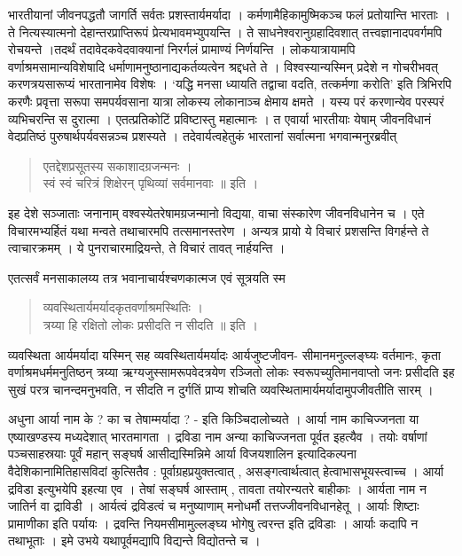 भारतीयानां जीवनपद्धतौ जागर्ति सर्वतः प्रशस्तार्यमर्यादा । कर्मणामैहिकामुष्मिकञ्च फलं प्रतोयान्ति भारताः । ते नित्यस्यात्मनो देहान्तरप्राप्तिरूपं प्रेत्यभावमभ्युपयन्ति । ते साधनेश्वरानुग्रहादिवशात् तत्त्वज्ञानादपवर्गमपि रोचयन्ते ।तदर्थं तदावेदकवेदवाक्यानां निरर्गलं प्रामाण्यं निर्णयन्ति । लोकयात्रायामपि वर्णाश्रमसामान्यविशेषादि धर्माणामनुष्ठानाद्यकर्तव्यत्वेन श्रद्दधते ते । विश्वस्यान्यस्मिन् प्रदेशे न गोचरीभवत् करणत्रयसारूप्यं भारतानामेव विशेषः  । ‘यद्धि मनसा ध्यायति  तद्वाचा वदति, तत्कर्मणा करोति’ इति त्रिभिरपि करणैः प्रवृत्ता सरूपा समपर्यवसाना यात्रा लोकस्य लोकानाञ्च क्षेमाय क्षमते । यस्य परं करणान्येव परस्परं व्यभिचरन्ति स दुरात्मा । एतत्प्रतिकोटिं प्रविष्टास्तु महात्मानः । त एवार्या भारतीयाः येषाम् जीवनविधानं वेदप्रतिष्ठं पुरुषार्थपर्यवसन्नञ्च प्रशस्यते । तदेवार्यत्वहेतुकं भारतानां सर्वात्मना भगवान्मनुरब्रवीत्  
\begin{verse}
एतद्देशप्रसूतस्य सकाशादग्रजन्मनः ।\\
स्वं स्वं चरित्रं शिक्षेरन् पृथिव्यां सर्वमानवाः ॥ इति ।
\end{verse}
इह देशे सञ्जाताः जनानाम् वश्वस्येतरेषामग्रजन्मानो विद्यया, वाचा संस्कारेण जीवनविधानेन च । एते विचारमभ्यर्हितं यथा मन्वते तथाचारमपि तत्समानस्तरेण । अन्यत्र प्रायो ये विचारं प्रशसन्ति विगर्हन्ते ते त्वाचारक्रमम् । ये पुनराचारमाद्रियन्ते, ते विचारं तावत् नार्हयन्ति ।

एतत्सर्वं मनसाकालय्य तत्र भवानाचार्यश्चणकात्मज एवं सूत्रयति स्म 
\begin{verse}
व्यवस्थितार्यमर्यादकृतवर्णाश्रमस्थितिः । \\
त्रय्या हि रक्षितो लोकः प्रसीदति न सीदति ॥ इति ।
\end{verse}
व्यवस्थिता आर्यमर्यादा यस्मिन् सह व्यवस्थितार्यमर्यादः आर्यजुष्टजीवन- सीमानमनुल्लङ्घ्यः वर्तमानः, कृता वर्णाश्रमधर्ममनुतिष्ठन् त्रय्या ऋग्यजुस्सामरूपवेदत्रयेण रञ्जितो लोकः स्वरूपच्युतिमानवाप्तो जनः प्रसीदति इह सुखं परत्र चानन्दमनुभवति, न सीदति न दुर्गतिं प्राप्य शोचति व्यवस्थितामार्यमर्यादामुपजीवतीति सारम् ।

अधुना आर्या नाम के ? का च तेषाम्मर्यादा ? - इति किञ्चिदालोच्यते । आर्या नाम काचिज्जनता या एष्याखण्डस्य मध्यदेशात् भारतमागता । द्रविडा नाम अन्या काचिज्जनता पूर्वत इहत्यैव । तयोः वर्षाणां पञ्चसाहस्रयाः पूर्वं महान् सङ्घर्ष आसीद्यस्मिन्निमे आर्या विजयशालिन इत्यादिकल्पना वैदेशिकानामितिहासविदां कुत्सितैव : पूर्वाग्रहप्रयुक्तत्वात् , असङ्गत्वार्थत्वात् हेत्वाभासभूयस्त्वाच्च । आर्या द्रविडा इत्युभयेपि इहत्या एव । तेषां सङ्घर्ष आस्ताम् , तावता तयोरन्यतरे बाहीकाः । आर्यता नाम न जातिर्न वा द्राविडी । आर्यत्वं द्रविडत्वं च मनुष्याणाम् मनोधर्मौ तत्तज्जीवनविधानहेतू । आर्याः शिष्टाः प्रामाणीका इति पर्यायः । द्रवन्ति नियमसीमामुल्लङ्घ्य भोगेषु त्वरन्त इति द्रविडाः । आर्याः कदापि न तथाभूताः । इमे उभये यथापूर्वमद्यापि विद्यन्ते विद्योतन्ते च । 

